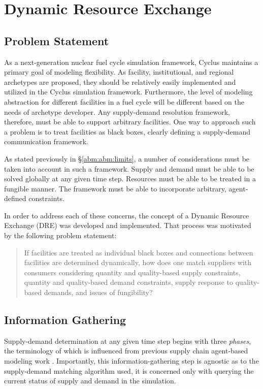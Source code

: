 
\section{Dynamic Resource Exchange}\label{abm:dre}

\subsection{Problem Statement}\label{abm:dre:prob}

As a next-generation nuclear fuel cycle simulation framework, Cyclus maintains a
primary goal of modeling flexibility. As facility, institutional, and regional
archetypes are proposed, they should be relatively easily implemented and
utilized in the Cyclus simulation framework. Furthermore, the level of modeling
abstraction for different facilities in a fuel cycle will be different based on
the needs of archetype developer. Any supply-demand resolution framework,
therefore, must be able to support arbitrary facilities. One way to approach
such a problem is to treat facilities as black boxes, clearly defining a
supply-demand communication framework.

As stated previously in \S \ref{abm:abm:limits}, a number of considerations must
be taken into account in such a framework. Supply and demand must be able to be
solved globally at any given time step. Resources must be able to be treated in
a fungible manner. The framework must be able to incorporate arbitrary,
agent-defined constraints.

In order to address each of these concerns, the concept of a Dynamic Resource
Exchange (DRE) was developed and implemented. That process was motivated by the
following problem statement:

\begin{quote}
    If facilities are treated as individual black boxes and connections between
    facilities are determined dynamically, how does one match suppliers with
    consumers considering quantity and quality-based supply constraints,
    quantity and quality-based demand constraints, supply response to
    quality-based demands, and issues of fungibility?
\end{quote}

\subsection{Information Gathering}\label{abm:dre:info}

Supply-demand determination at any given time step begins with three
\textit{phases}, the terminology of which is influenced from previous supply
chain agent-based modeling work \cite{julka_agent-based_2002}. Importantly, this
information-gathering step is agnostic as to the supply-demand matching
algorithm used, it is concerned only with querying the current status of supply
and demand in the simulation.

